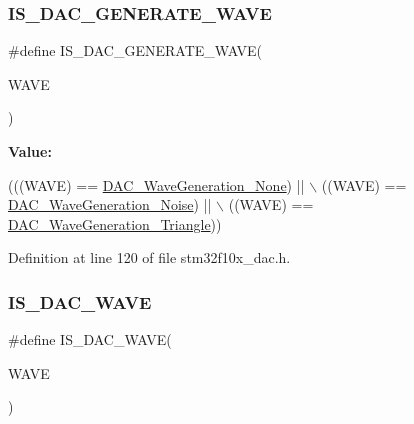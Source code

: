 \mbox{\label{group___d_a_c__wave__generation_ga50fb2dd12305cd7bd0b738a1f6388d3c}} 
\subsubsection{\texorpdfstring{I\+S\+\_\+\+D\+A\+C\+\_\+\+G\+E\+N\+E\+R\+A\+T\+E\+\_\+\+W\+A\+VE}{IS\_DAC\_GENERATE\_WAVE}}
{\footnotesize\ttfamily \#define I\+S\+\_\+\+D\+A\+C\+\_\+\+G\+E\+N\+E\+R\+A\+T\+E\+\_\+\+W\+A\+VE(\begin{DoxyParamCaption}\item[{}]{W\+A\+VE }\end{DoxyParamCaption})}

{\bfseries Value\+:}
\begin{DoxyCode}
(((WAVE) == \hyperlink{group___d_a_c__wave__generation_gaabbcd575d6106267f6b65ce988158f29}{DAC\_WaveGeneration\_None}) || \(\backslash\)
                                    ((WAVE) == \hyperlink{group___d_a_c__wave__generation_ga1692990325098cae6f32182c1fa0f61e}{DAC\_WaveGeneration\_Noise}) || \(\backslash\)
                                    ((WAVE) == \hyperlink{group___d_a_c__wave__generation_ga68f1a71011437a5ea6298ab039554714}{DAC\_WaveGeneration\_Triangle}))
\end{DoxyCode}


Definition at line 120 of file stm32f10x\+\_\+dac.\+h.

\mbox{\label{group___d_a_c__wave__generation_ga45c25065fb713820f6dbae0009376e1c}} 
\subsubsection{\texorpdfstring{I\+S\+\_\+\+D\+A\+C\+\_\+\+W\+A\+VE}{IS\_DAC\_WAVE}}
{\footnotesize\ttfamily \#define I\+S\+\_\+\+D\+A\+C\+\_\+\+W\+A\+VE(\begin{DoxyParamCaption}\item[{}]{W\+A\+VE }\end{DoxyParamCaption})}

